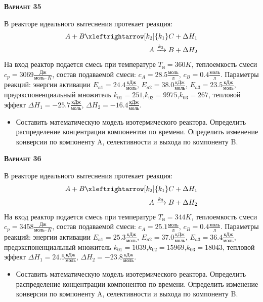 \textsc{\textbf{Вариант 35}}

 В реакторе идеального вытеснения протекает реакция: \begin{equation*} \begin{aligned} A+B \xleftrightarrow[k_2]{k_1} C +\Delta H_1 \\ A \xrightarrow{k_3} B + \Delta H_2 \end{aligned} \end{equation*}                             На вход  реактор подается смесь при температуре $ T_{н} =  360 K$, теплоемкость смеси $c_p= 3069 \frac{Дж}{моль \cdot K}$, состав подаваемой смеси: $c_A=28.5 \frac{моль}{л}$, $c_B=0.4 \frac{моль}{л}$. Параметры реакций: энергии активации $E_{a1}=24.4 \frac{кДж}{моль}$, $E_{a2}=38.0  \frac{кДж}{моль}$, $E_{a3}=23.5  \frac{кДж}{моль}$, предэкспоненциальный множитель $k_{01}=       251$,$k_{02}=      9975$,$k_{03}=       267$, тепловой эффект $\Delta H_1= -25.7  \frac{кДж}{моль}$, $\Delta H_2=-16.4 \frac{кДж}{моль}$.\begin{itemize} \item Составить математическую модель изотермического реактора. Определить распределение концентрации компонентов по времени. Определить изменение конверсии по компоненту A, селективности и выхода по компоненту B. \end{itemize}

\textsc{\textbf{Вариант 36}}

 В реакторе идеального вытеснения протекает реакция: \begin{equation*} \begin{aligned} A+B \xleftrightarrow[k_2]{k_1} C +\Delta H_1 \\ A \xrightarrow{k_3} B + \Delta H_2 \end{aligned} \end{equation*}                             На вход  реактор подается смесь при температуре $ T_{н} =  344 K$, теплоемкость смеси $c_p= 3458 \frac{Дж}{моль \cdot K}$, состав подаваемой смеси: $c_A=25.1 \frac{моль}{л}$, $c_B=0.4 \frac{моль}{л}$. Параметры реакций: энергии активации $E_{a1}=25.3 \frac{кДж}{моль}$, $E_{a2}=37.0  \frac{кДж}{моль}$, $E_{a3}=36.4  \frac{кДж}{моль}$, предэкспоненциальный множитель $k_{01}=      1039$,$k_{02}=     15969$,$k_{03}=     18043$, тепловой эффект $\Delta H_1= 24.5  \frac{кДж}{моль}$, $\Delta H_2=-23.8 \frac{кДж}{моль}$.\begin{itemize} \item Составить математическую модель изотермического реактора. Определить распределение концентрации компонентов по времени. Определить изменение конверсии по компоненту A, селективности и выхода по компоненту B. \end{itemize}

